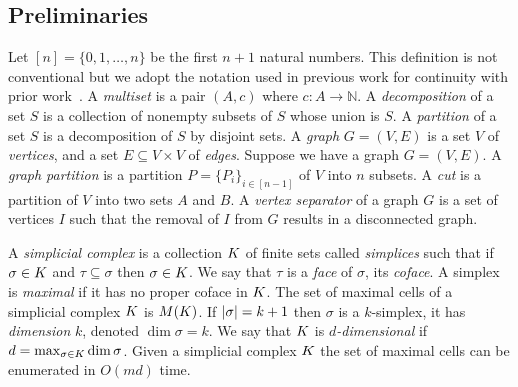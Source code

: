\documentclass{elsarticle}
\begin{document}
\subsection{Preliminaries}
Let $[n] = \{ 0,1, \ldots ,n \}$ be the first $n+1$ natural numbers. This
definition is not conventional but we adopt the notation used
in previous work for continuity with prior work~\cite{zc-lh-08}. A \emph{multiset}
is a pair $(A,c)$ where $c: A \rightarrow \mathbb{N}$. A \emph{decomposition}
of a set $S$ is a collection of nonempty subsets of $S$ whose union is $S$.
A \emph{partition} of a set $S$ is a decomposition of $S$ by disjoint sets.
A \emph{graph} $G = (V,E)$ is a set $V$ of \emph{vertices}, and 
a set $E \subseteq V \times V$  of \emph{edges}. 
Suppose we have a graph $G = (V,E)$. A \emph{graph partition} is a partition 
$P = \{P_i\}_{i \in [n-1]}$ of $V$ into $n$ subsets. 
A \emph{cut} is a partition of $V$ into two sets $A$ and $B$. A \emph{vertex separator}
of a graph $G$ is a set of vertices $I$ such that the removal of $I$ from $G$ results
in a disconnected graph.  

A \emph{simplicial complex} is a collection $K$ of finite sets called
\emph{simplices} such that if $\sigma \in K$ and $\tau \subseteq \sigma$ then 
$\sigma \in K$. 
We say that $\tau$ is a \emph{face} of $\sigma$, its \emph{coface}. A simplex
is \emph{maximal} if it has no proper coface in $K$. The set of maximal cells of a 
simplicial complex $K$ is $M(K)$. If $|\sigma| = k+1$
then $\sigma$ is a $k$-simplex, it has \emph{dimension} $k$, denoted 
$\dim{\sigma} = k$. We say that $K$ is \emph{$d$-dimensional} if 
$d = \max_{\sigma \in K} \dim{\sigma}$. 
Given a simplicial complex $K$ the set of maximal 
cells can be enumerated in $O(md)$ time.
\end{document}
